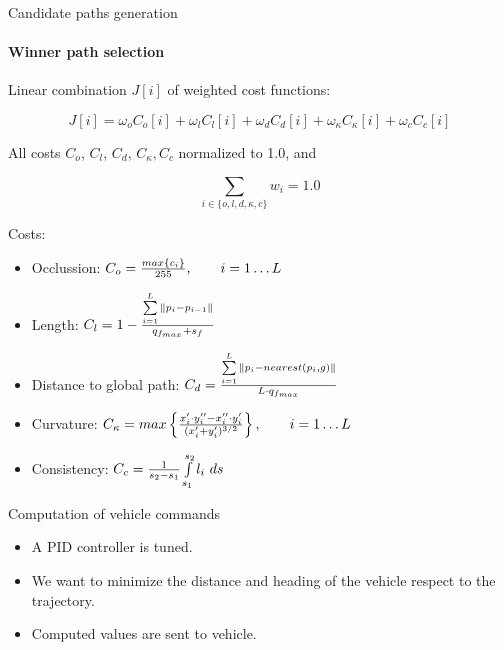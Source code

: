 \begin{frame}{Candidate paths generation}
  \framesubtitle{Winner path selection}
    
  \begin{itemize}
     {
    \item Linear combination $J[i]$ of weighted cost functions:
    \begin{minipage}[c]{\textwidth}
      \vskip 0.5cm
      \begin{equation}\nonumber
	J[i] = \omega_o C_o[i] + \omega_l C_l[i] + \omega_d C_d[i] + \omega_{\kappa} C_{\kappa}[i] + \omega_c C_c[i]
      \end{equation}
    \end{minipage}
    \vskip 1.0cm
    \item All costs $C_o$, $C_l$, $C_d$, $C_{\kappa}, C_c$ normalized to 1.0, and
    \begin{minipage}[c]{\textwidth}
      \vskip 0.5cm
      \begin{equation}\nonumber
	\sum_{{i \in \{o, l, d, \kappa, c\}}} w_i= 1.0
      \end{equation}
      \vskip 0.5cm
    \end{minipage}
    }
     {
    \item Costs:
    \begin{itemize}
     \item Occlussion: $C_o = {{max\{c_i\}} \over 255}, ~~~~~~ i=1 \dots L$
     \item Length: $C_l = 1- {{\sum\limits_{i=1}^{L}\|p_i - p_{i - 1}\|} \over {q_{f_{max}} + s_f}}$
     \item Distance to global path: $C_d = {{\sum\limits_{i=1}^{L}\|p_i - nearest(p_i, g)\|} \over {L \cdot q_{f_{max}}}}$
     \item Curvature: $C_{\kappa} = max \left \{ {{x_i' \cdot y_i'' - x_i'' \cdot y_i'} \over {(x_i' + y_i')^{3/2}}} \right \}, ~~~~~~ i=1 \dots L$
     \item Consistency: $C_c = {1 \over {s_2 - s_1}} \int \limits_{s_1}^{s_2} l_i ~ ds$
    \end{itemize}
  }
  \end{itemize}

  
  \note {
    
  }
\end{frame}

\begin{frame}{Computation of vehicle commands}
  \begin{itemize}
    \item A PID controller is tuned.
    \item We want to minimize the distance and heading of the vehicle respect to the trajectory.
    \item Computed values are sent to vehicle.
  \end{itemize}

\end{frame}

